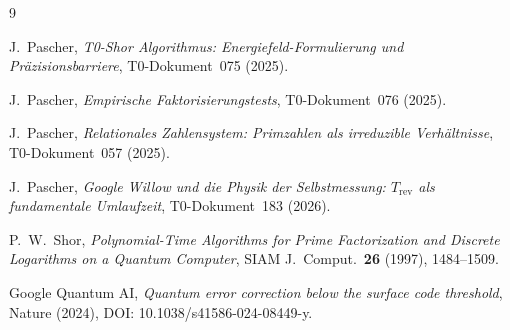 \begin{thebibliography}{9}

J.~Pascher, \textit{T0-Shor Algorithmus: Energiefeld-Formulierung und
Präzisionsbarriere}, T0-Dokument~075 (2025).

J.~Pascher, \textit{Empirische Faktorisierungstests}, T0-Dokument~076 (2025).

J.~Pascher, \textit{Relationales Zahlensystem: Primzahlen als irreduzible
Verhältnisse}, T0-Dokument~057 (2025).

J.~Pascher, \textit{Google Willow und die Physik der Selbstmessung: $T_\text{rev}$
als fundamentale Umlaufzeit}, T0-Dokument~183 (2026).

P.~W.~Shor, \textit{Polynomial-Time Algorithms for Prime Factorization and
Discrete Logarithms on a Quantum Computer}, SIAM J.\ Comput.\ \textbf{26}
(1997), 1484--1509.

Google Quantum AI, \textit{Quantum error correction below the surface code
threshold}, Nature (2024), DOI: 10.1038/s41586-024-08449-y.

\end{thebibliography}
